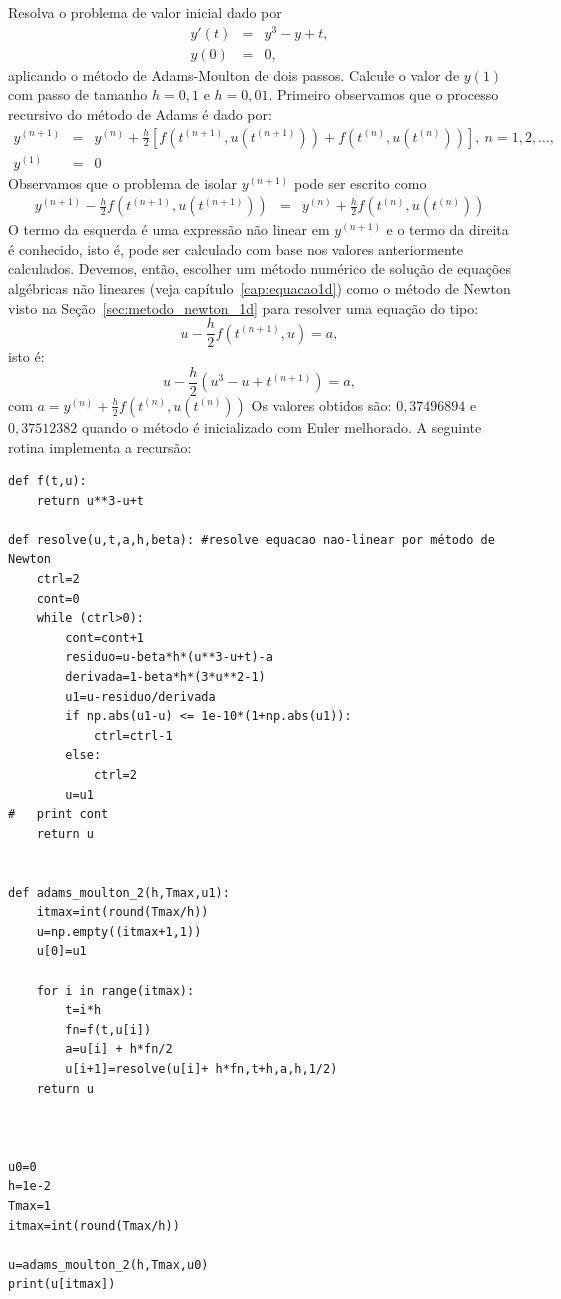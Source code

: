 \begin{exeresol}\label{exeresol:exersol_moulton_nl} Resolva o problema de valor inicial dado por
\begin{eqnarray}
 y'(t)&=& y^3-y+t,\\
 y(0)&=& 0,
\end{eqnarray}
aplicando o método de Adams-Moulton de dois passos. Calcule o valor de $y(1)$ com passo de tamanho $h=0,1$ e $h=0,01$.
Primeiro observamos que o processo recursivo do método de Adams é dado por:
\begin{eqnarray}
  y^{(n+1)}&=&y^{(n)}+\frac{h}{2}\left[f\left(t^{(n+1)},u(t^{(n+1)})\right)+f\left(t^{(n)},u(t^{(n)})\right)\right],~n=1,2,\ldots,\\
  y^{(1)}&=&0
 \end{eqnarray}
Observamos que o problema de isolar $y^{(n+1)}$ pode ser escrito como
\begin{eqnarray}
  y^{(n+1)}-\frac{h}{2}f\left(t^{(n+1)},u(t^{(n+1)})\right) &=&y^{(n)}+\frac{h}{2}f\left(t^{(n)},u(t^{(n)})\right)
 \end{eqnarray}
O termo da esquerda é uma expressão não linear em $y^{(n+1)}$ e o termo da direita é conhecido, isto é, pode ser calculado com base nos valores anteriormente calculados. Devemos, então, escolher um método numérico de solução de equações algébricas não lineares (veja capítulo~\ref{cap:equacao1d}) como o método de Newton visto na Seção~\ref{sec:metodo_newton_1d} para resolver uma equação do tipo:
\begin{equation} u-\frac{h}{2}f(t^{(n+1)},u)=a, \end{equation}
isto é:
\begin{equation} u-\frac{h}{2}\left(u^3-u+t^{(n+1)}\right)=a, \end{equation}
com $a=y^{(n)}+\frac{h}{2}f\left(t^{(n)},u(t^{(n)})\right)$
Os valores obtidos são: $0,37496894$ e $0,37512382$ quando o método é inicializado com Euler melhorado.
\ifispython
A seguinte rotina implementa a recursão:
\begin{verbatim}
def f(t,u):
	return u**3-u+t

def resolve(u,t,a,h,beta): #resolve equacao nao-linear por método de Newton
	ctrl=2
	cont=0
	while (ctrl>0):
		cont=cont+1
		residuo=u-beta*h*(u**3-u+t)-a
		derivada=1-beta*h*(3*u**2-1)
		u1=u-residuo/derivada
		if np.abs(u1-u) <= 1e-10*(1+np.abs(u1)):
			ctrl=ctrl-1
		else:
			ctrl=2
		u=u1
#	print cont
	return u


def adams_moulton_2(h,Tmax,u1):
	itmax=int(round(Tmax/h))
	u=np.empty((itmax+1,1))
	u[0]=u1

	for i in range(itmax):
		t=i*h
		fn=f(t,u[i])
		a=u[i] + h*fn/2
		u[i+1]=resolve(u[i]+ h*fn,t+h,a,h,1/2)
	return u



u0=0
h=1e-2
Tmax=1
itmax=int(round(Tmax/h))

u=adams_moulton_2(h,Tmax,u0)
print(u[itmax])

\end{verbatim}

\fi
\end{exeresol}


